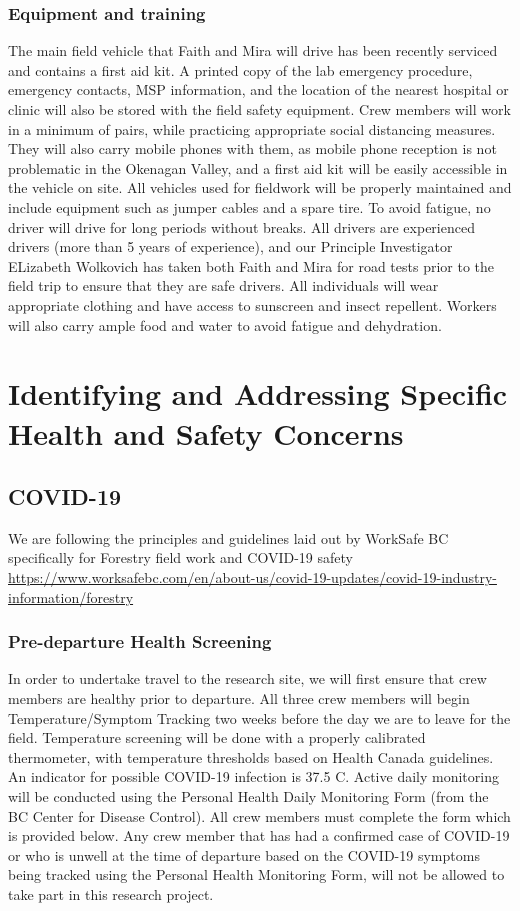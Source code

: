 \documentclass[11pt,letter]{article}
\begin{document}
\subsubsection{Equipment and training}
The main field vehicle that Faith and Mira will drive has been recently serviced and contains a first aid kit. A printed copy of the lab emergency procedure, emergency contacts, MSP information, and the location of the nearest hospital or clinic will also be stored with the field safety equipment. Crew members will work in a minimum of pairs, while practicing appropriate social distancing measures. They will also carry mobile phones with them, as mobile phone reception is not problematic in the Okenagan Valley, and a first aid kit will be easily accessible in the vehicle on site. All vehicles used for fieldwork will be properly maintained and include equipment such as jumper cables and a spare tire. To avoid fatigue, no driver will drive for long periods without breaks. All drivers are experienced drivers (more than 5 years of experience), and our Principle Investigator ELizabeth Wolkovich has taken both Faith and Mira for road tests prior to the field trip to ensure that they are safe drivers. All individuals will wear appropriate clothing and have access to sunscreen and insect repellent. Workers will also carry ample food and water to avoid fatigue and dehydration.  


\section{Identifying and Addressing Specific Health and Safety Concerns}

\subsection{COVID-19}

We are following the principles and guidelines laid out by WorkSafe BC specifically for Forestry field work and COVID-19 safety \url{https://www.worksafebc.com/en/about-us/covid-19-updates/covid-19-industry-information/forestry} 

\subsubsection {Pre-departure Health Screening}
In order to undertake travel to the research site, we will first ensure that crew members are healthy prior to departure. All three crew members will begin Temperature/Symptom Tracking two weeks before the day we are to leave for the field. Temperature screening will be done with a properly calibrated thermometer, with temperature thresholds based on Health Canada guidelines. An indicator for possible COVID-19 infection is 37.5 C. Active daily monitoring will be conducted using the Personal Health Daily Monitoring Form (from the BC Center for Disease Control). All crew members must complete the form which is provided below. Any crew member that has had a confirmed case of COVID-19 or who is unwell at the time of departure based on the COVID-19 symptoms being tracked using the Personal Health Monitoring Form, will not be allowed to take part in this research project.
\end{document}
